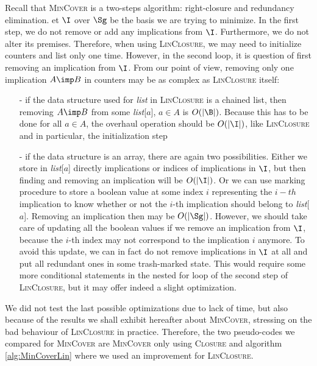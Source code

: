 Recall that \textsc{MinCover} is a two-steps algorithm: right-closure and redundancy elimination. et $\I$ over $\Sg$ be the basis we are trying to minimize. In the first step, we do not remove or add any implications from
$\I$. Furthermore, we do not alter its premises. Therefore, when using
\textsc{LinClosure}, we may need to initialize counters and list only one
time. However, in the second loop, it is question of first removing an implication from $\I$. From our point of view, removing only one implication
$A \imp B$ in counters may be as complex as \textsc{LinClosure} itself:
\begin{itemize}
	\item[-] if the data structure used for \textit{list} in \textsc{LinClosure}
	is a chained list, then removing $A \imp B$ from some \textit{list}[$a$], $a \in A$ is $O(|\B|)$. Because this has to be done for all $a \in A$, the 
	overhaul operation should be $O(|\I|)$, like \textsc{LinClosure} and in particular, the initialization step
	\item[-] if the data structure is an array, there are again two possibilities. Either we store in \textit{list}[$a$] directly implications or indices of implications in $\I$, but then finding and removing an implication will be $O(|\I|)$. Or we can use marking procedure to store a boolean value at some index $i$ representing the $i-th$ implication to know
	whether or not the $i$-th implication should belong to \textit{list}[$a$]. Removing an implication then may be $O(|\Sg|)$. However, we should take care
	of updating all the boolean values  if we remove an implication from $\I$, because the $i$-th index may not correspond to the implication $i$ anymore. To avoid this update, we can in fact do not remove implications in $\I$ at
	all and put all redundant ones in some trash-marked state. This would require some more conditional statements in the nested for loop of the second step of \textsc{LinClosure}, but it may offer indeed a slight optimization.
\end{itemize}
\noindent We did not test the last possible optimizations due to lack of time,
but also because of the results we shall exhibit hereafter about \textsc{MinCover}, stressing on the bad behaviour of \textsc{LinClosure} in practice. Therefore, the two pseudo-codes we compared for \textsc{MinCover} are
\textsc{MinCover} only using \textsc{Closure} and algorithm \ref{alg:MinCoverLin} where we used an improvement for \textsc{LinClosure}.

\vspace{1.2em}

